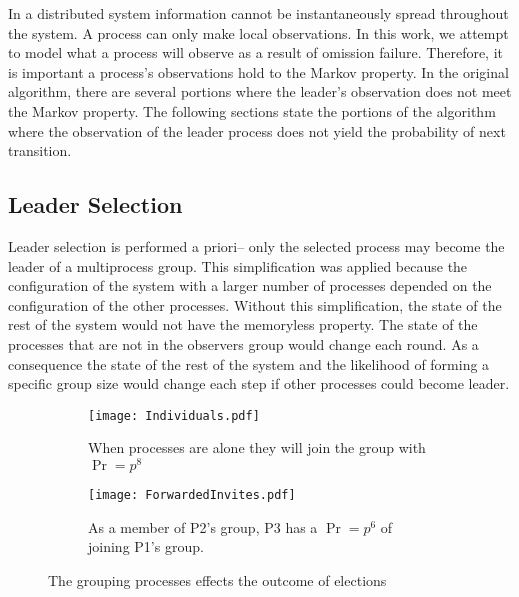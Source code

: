 In a distributed system information cannot be instantaneously spread throughout the system.
A process can only make local observations.
In this work, we attempt to model what a process will observe as a result of omission failure.
Therefore, it is important a process's observations hold to the Markov property.
In the original algorithm, there are several portions where the leader's observation does not meet the Markov property.
The following sections state the portions of the algorithm where the observation of the leader process does not yield the probability of next transition.

\subsection{Leader Selection}

Leader selection is performed a priori-- only the selected process may become the leader of a multiprocess group.
This simplification was applied because the configuration of the system with a larger number of processes depended on the configuration of the other processes.
Without this simplification, the state of the rest of the system would not have the memoryless property.
The state of the processes that are not in the observers group would change each round.
As a consequence the state of the rest of the system and the likelihood of forming a specific group size would change each step if other processes could become leader.

\begin{figure}
\begin{subfigure}{0.45\textwidth}
\texttt{[image: Individuals.pdf]}
\caption{When processes are alone they will join the group with $\Pr=p^8$} \label{fig:groupinga}
\end{subfigure}
\hspace*{\fill} %
\begin{subfigure}{0.45\textwidth}
\texttt{[image: ForwardedInvites.pdf]}
\caption{As a member of P2's group, P3 has a $\Pr=p^6$ of joining P1's group.} \label{fig:groupingb}
\end{subfigure}
\caption{The grouping processes effects the outcome of elections} \label{fig:grouping}
\end{figure}

